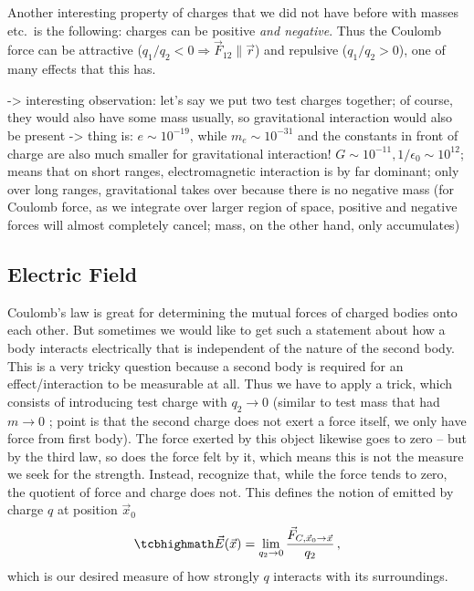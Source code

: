 \documentclass[../class_mech_main.tex]{subfiles}
\begin{document}
Another interesting property of charges that we did not have before with masses etc.~is the following: charges can be positive \emph{and negative}. Thus the Coulomb force can be attractive ($q_1 / q_2 < 0 \Rightarrow \vec{F}_{12} \parallel \vec{r}$) and repulsive ($q_1 / q_2 > 0$), one of many effects that this has.


-> interesting observation: let's say we put two test charges together; of course, they would also have some mass usually, so gravitational interaction would also be present -> thing is: $e \sim 10^{-19}$, while $m_e \sim 10^{-31}$ and the constants in front of charge are also much smaller for gravitational interaction! $G \sim 10^{-11}, 1/\epsilon_0 \sim 10^{12}$; means that on short ranges, electromagnetic interaction is by far dominant; only over long ranges, gravitational takes over because there is no negative mass (for Coulomb force, as we integrate over larger region of space, positive and negative forces will almost completely cancel; mass, on the other hand, only accumulates)



        \subsection{Electric Field}
Coulomb's law is great for determining the mutual forces of charged bodies onto each other. But sometimes we would like to get such a statement about how a body interacts electrically that is independent of the nature of the second body. This is a very tricky question because a second body is required for an effect/interaction to be measurable at all. Thus we have to apply a trick, which consists of introducing test charge with $q_2 \rightarrow 0$ (similar to test mass that had $m \rightarrow 0$ ; point is that the second charge does not exert a force itself, we only have force from first body). The force exerted by this object likewise goes to zero -- but by the third law, so does the force felt by it, which means this is not the measure we seek for the strength. Instead, recognize that, while the force tends to zero, the quotient of force and charge does not. This defines the notion of  emitted by charge $q$ at position $\vec{x}_0$
\begin{equation}
    \eqbox{
        \vec{E}(\vec{x})
        = \lim_{q_2 \rightarrow 0} \frac{\vec{F}_{C, \vec{x}_0 \rightarrow \vec{x}}}{q_2}
    } \, ,
\end{equation}
which is our desired measure of how strongly $q$ interacts with its surroundings.
\end{document}
